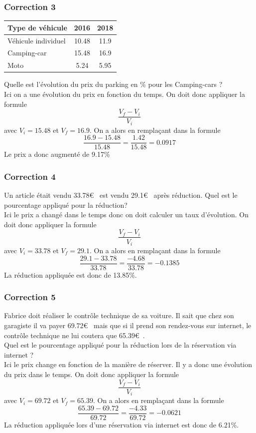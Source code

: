 \documentclass[15pt, mathserif]{beamer}
\begin{document}
\begin{frame}
\vspace{-10mm}
	\frametitle{Correction 3}
 
 \begin{center} 
 \begin{tabular}{|C{3cm}|c|c|} 
 \hline 
 {\small Type de véhicule} & {\small 2016} & {\small 2018} \\ 
 \hline 
 {\small Véhicule individuel} & 10.48& 11.9\\ 
 \hline 
 {\small Camping-car } & 15.48& 16.9\\ 
 \hline 
 {\small Moto } & 5.24& 5.95\\ 
 \hline 
 \end{tabular} 
\end{center} 
  {\small Quelle est l'évolution du prix du parking en \% pour les Camping-cars ?\\ Ici on a une évolution du prix en fonction du temps. On doit donc appliquer la formule} $$\dfrac{V_f-V_i}{V_i}$$ avec $V_i =15.48$ et $V_f=16.9$. On a alors en remplaçant dans la formule $$\dfrac{16.9-15.48}{15.48}= \dfrac{1.42}{15.48} = 0.0917$$ {\small Le prix a donc augmenté de  9.17\% } \end{frame}


\begin{frame}
\vspace{-10mm}
	\frametitle{Correction 4}
Un article était vendu 33.78\euro ~ est vendu 29.1\euro ~ après réduction. Quel est le pourcentage appliqué pour la réduction? \\ Ici le prix a changé dans le temps donc on doit calculer un taux d'évolution. On doit donc appliquer la formule $$\dfrac{V_f-V_i}{V_i}$$ avec $V_i =33.78$ et $V_f=29.1$. On a alors en remplaçant dans la formule $$\dfrac{29.1-33.78}{33.78}= \dfrac{-4.68}{33.78}=-0.1385$$ La réduction appliquée est donc de 13.85\%.\end{frame}


\begin{frame}
\vspace{-10mm}
	\frametitle{Correction 5}
\vspace*{1cm} {\small Fabrice doit réaliser le contrôle technique de sa voiture. Il sait que chez son garagiste il va payer 69.72\euro ~ mais que si il prend son rendez-vous sur internet, le contrôle technique ne lui coutera que  65.39\euro ~. \\ Quel est le pourcentage appliqué pour la réduction lors de la réservation via internet ? \\ Ici le prix change en fonction de la manière de réserver. Il y a donc une évolution du prix dans le temps. On doit donc appliquer la formule } $$\dfrac{V_f-V_i}{V_i}$$ avec $V_i =69.72$ et $V_f=65.39$. {\small On a alors en remplaçant dans la formule } $$\dfrac{65.39-69.72}{69.72}= \dfrac{-4.33}{69.72}=-0.0621$$ {\small La réduction appliquée lors d'une réservation via internet est donc de 6.21\%.}\end{frame}
\end{document}
